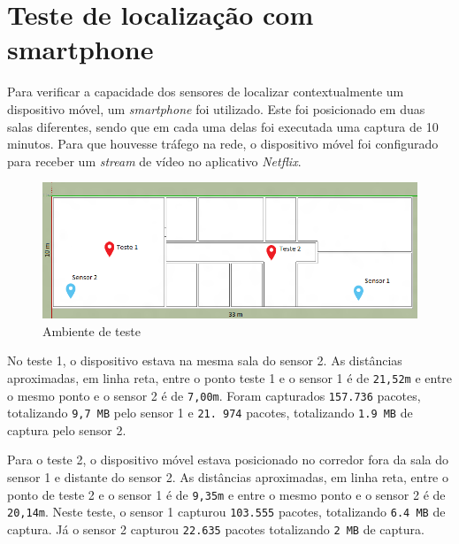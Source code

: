 \section{Teste de localização com smartphone}
\label{sec:teste-smarphone}

Para verificar a capacidade dos sensores de localizar contextualmente um
dispositivo móvel, um \emph{smartphone} foi utilizado. Este foi posicionado em duas salas
diferentes, sendo que em cada uma delas foi executada uma captura de 10 minutos. Para
que houvesse tráfego na rede, o dispositivo móvel foi configurado para receber um
\emph{stream} de vídeo no aplicativo \emph{Netflix}.

\begin{figure}[htb]
	\caption{\label{fig-planta-baixa}Ambiente de teste}
	\begin{center}
		\includegraphics[width=1\textwidth]{060-testes/data-analisis/planta-baixa-smartphone.png}
	\end{center}
\end{figure}


No teste 1, o dispositivo estava na mesma sala do sensor 2. As distâncias
aproximadas, em linha reta, entre o ponto teste 1 e o sensor 1 é de \texttt{21,52m} e
entre o mesmo ponto e o sensor 2 é de \texttt{7,00m}. Foram capturados
\texttt{157.736} pacotes, totalizando \texttt{9,7 MB} pelo sensor 1 e \texttt{21.
974} pacotes, totalizando \texttt{1.9 MB} de captura pelo sensor 2.

Para o teste 2, o dispositivo móvel estava posicionado no corredor fora da sala
do sensor 1 e distante do sensor 2. As distâncias aproximadas, em linha reta, entre o
ponto de teste 2 e o sensor 1 é de \texttt{9,35m} e entre o mesmo ponto e o sensor
2 é de \texttt{20,14m}. Neste teste, o sensor 1 capturou \texttt{103.555} pacotes,
totalizando \texttt{6.4 MB} de captura. Já o sensor 2 capturou \texttt{22.635}
pacotes totalizando \texttt{2 MB} de captura.

